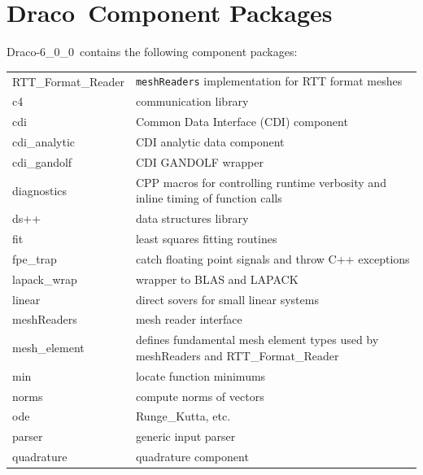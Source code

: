 \documentclass[note]{ResearchNote}
\newcommand{\draco}{Draco}
\newcommand{\dracor}{\draco-6\_0\_0}
\newcommand{\tableText}[1]{{\raggedright #1}}
\begin{document}
\newpage

\section{\draco\ Component Packages}

\dracor\ contains the following component packages:
\begin{center}
  \footnotesize
  \begin{tabular}{lp{4.0in}}
    \hline\hline 

    RTT\_Format\_Reader & \tableText{\texttt{meshReaders}
      implementation for RTT format meshes} \\
    c4 & \tableText{communication library} \\
    cdi & \tableText{Common Data Interface (CDI) component} \\
    cdi\_analytic & \tableText{CDI analytic data component} \\
    cdi\_gandolf & \tableText{CDI GANDOLF wrapper} \\
    diagnostics  & \tableText{CPP macros for controlling runtime
      verbosity and inline timing of function calls} \\
    ds++         & \tableText{data structures library} \\
    fit          & \tableText{least squares fitting routines} \\
    fpe\_trap    & \tableText{catch floating point signals and throw
      C++ exceptions} \\
    lapack\_wrap & \tableText{wrapper to BLAS and LAPACK} \\
    linear       & \tableText{direct sovers for small linear systems} \\
    meshReaders  & \tableText{mesh reader interface} \\
    mesh\_element & \tableText{defines fundamental mesh element types
      used by meshReaders and RTT\_Format\_Reader} \\
    min          & \tableText{locate function minimums} \\
    norms        & \tableText{compute norms of vectors} \\
    ode          & \tableText{Runge\_Kutta, etc.} \\
    parser       & \tableText{generic input parser} \\
    quadrature   & \tableText{quadrature component} \\

\end{tabular}
\end{center}
\end{document}
